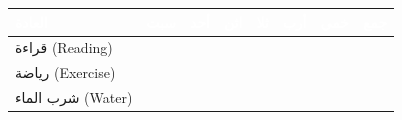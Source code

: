 \documentclass[11pt,a4paper]{article}
\begin{document}
\vspace{0.25cm}

\noindent
\begin{tcolorbox}[colback=planbg,colframe=planaccent,boxrule=0.6pt,arc=2pt,
  fonttitle=\bfseries\color{white},coltitle=white,title=تتبّع العادات (Habit Tracker),
  left=6pt,right=6pt,top=4pt,bottom=4pt]
{\renewcommand{\arraystretch}{1.2}
\begin{tabularx}{\linewidth}{|X|c|c|c|c|c|c|c|}
\hline
\rowcolor{planhead}
\textcolor{white}{\textbf{العادة}} &
\textcolor{white}{\textbf{سبت}} &
\textcolor{white}{\textbf{أحد}} &
\textcolor{white}{\textbf{اثن}} &
\textcolor{white}{\textbf{ثلا}} &
\textcolor{white}{\textbf{أرب}} &
\textcolor{white}{\textbf{خمي}} &
\textcolor{white}{\textbf{جمع}} \\
\hline
قراءة (Reading) & & & & & & & \\
\hline
رياضة (Exercise) & & & & & & & \\
\hline
شرب الماء (Water) & & & & & & & \\
\hline
\end{tabularx}}
\end{tcolorbox}

\vspace{0.25cm}

\begin{notesbox}
\vspace{0.3cm}
\end{notesbox}
\end{document}
